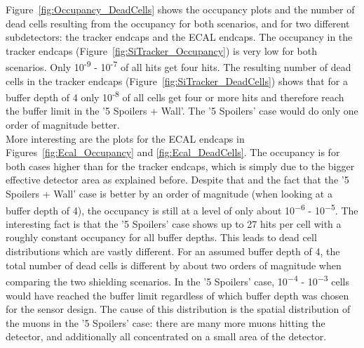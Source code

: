 Figure~\ref{fig:Occupancy_DeadCells} shows the occupancy plots and the number of dead cells resulting from the occupancy for both scenarios, and for two different subdetectors: the tracker endcaps and the ECAL endcaps.
The occupancy in the tracker endcaps (Figure~\ref{fig:SiTracker_Occupancy}) is very low for both scenarios.
Only 10\textsuperscript{-9} - 10\textsuperscript{-7} of all hits get four hits.
The resulting number of dead cells in the tracker endcaps (Figure~\ref{fig:SiTracker_DeadCells}) shows that for a buffer depth of 4 only 10\textsuperscript{-8} of all cells get four or more hits and therefore reach the buffer limit in the '5 Spoilers + Wall'.
The '5 Spoilers' case would do only one order of magnitude better.\\
More interesting are the plots for the ECAL endcaps in Figures~\ref{fig:Ecal_Occupancy} and \ref{fig:Ecal_DeadCells}.
The occupancy is for both cases higher than for the tracker endcaps, which is simply due to the bigger effective detector area as explained before.
Despite that and the fact that the ’5 Spoilers + Wall’ case is better by an order of magnitude (when looking at a buffer depth of 4), the occupancy is still at a level of only about 10\textsuperscript{−6} - 10\textsuperscript{−5}.
The interesting fact is that the ’5 Spoilers’ case shows up to 27 hits per cell with a roughly constant occupancy for all buffer depths.
This leads to dead cell distributions which are vastly different.
For an assumed buffer depth of 4, the total number of dead cells is different by about two orders of magnitude when comparing the two shielding scenarios.
In the ’5 Spoilers’ case, 10\textsuperscript{−4} - 10\textsuperscript{−3} cells would have reached the buffer limit regardless of which buffer depth was chosen for the sensor design.
The cause of this distribution is the spatial distribution of the muons in the ’5 Spoilers’ case: there are many more muons hitting the detector, and additionally all concentrated on a small area of the detector.

